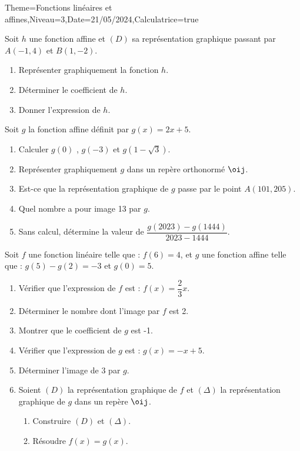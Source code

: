 \documentclass[a4paper,12pt]{article}
\begin{document}
\begin{Maquette}[Fiche]{Theme=Fonctions linéaires et affines,Niveau=3,Date=21/05/2024,Calculatrice=true}
\begin{exercice}
Soit $h$ une fonction affine et $(D)$ sa représentation graphique passant par $A(-1,4)$ et $B(1,-2)$.
\begin{enumerate}
\item Représenter graphiquement la fonction $h$.
\item Déterminer le coefficient de $h$.
\item Donner l'expression de $h$.
\end{enumerate}
\end{exercice}
\newpage

\begin{exercice}
Soit $g$ la fonction affine définit par $g(x)=2x+5$.
\begin{enumerate}
\item Calculer $g(0)$ , $g(-3)$ et $g(1-\sqrt{3})$.
\item Représenter graphiquement $g$ dans un repère orthonormé $\oij$.
\item Est-ce que la représentation graphique de $g$  passe par le point $A(101,205)$.
\item Quel nombre a pour image 13 par $g$. 
\item Sans calcul, détermine la valeur de $\dfrac{g(2023)-g(1444)}{2023-1444}$.
\end{enumerate}
\end{exercice}

\begin{exercice}
Soit $f$ une fonction linéaire telle que : $f(6)=4$, et $g$ une fonction affine telle que : $g(5)-g(2)=-3$ et $g(0)=5$.
\begin{enumerate}
\item Vérifier que l'expression de $f$ est : $f(x)=\dfrac{2}{3}x$.
\item Déterminer le nombre dont l'image par $f$ est 2.
\item Montrer que le coefficient de $g$ est -1.
\item Vérifier que l'expression de $g$ est : $g(x)=-x+5$.
\item Déterminer l'image de 3 par $g$.
\item Soient $(D)$ la représentation graphique de $f$ et $(\Delta)$ la représentation graphique de $g$ dans un repère $\oij$.
\begin{enumerate}
\item Construire $(D)$ et $(\Delta)$.
\item Résoudre $f(x)=g(x)$.
\end{enumerate}
\end{enumerate}
\end{exercice}


\end{Maquette}
\end{document}

